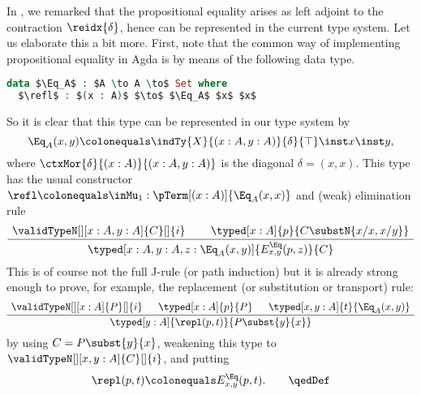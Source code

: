 \documentclass[preprint]{sigplanconf}
\begin{document}
\begin{example}
  In , we remarked that the propositional equality
  arises as left adjoint to the contraction $\reidx{\delta}$, hence can
  be represented in the current type system.
  Let us elaborate this a bit more.
  First, note that the common way of implementing propositional equality in
  Agda is by means of the following data type.
  \begin{lstlisting}[language=Agda,mathescape=true,columns=flexible]
data $\Eq_A$ : $A \to A \to$ Set where
  $\refl$ : $(x : A)$ $\to$ $\Eq_A$ $x$ $x$
  \end{lstlisting}
  So it is clear that this type can be represented in our type system by
  \begin{equation*}
    \Eq_A(x,y)  \colonequals
    \indTy{X}{(x : A, y : A)}{\delta}{\top} \inst x \inst y,
  \end{equation*}
  where $\ctxMor{\delta}{(x : A)}{(x : A, y : A)}$ is the diagonal
  $\delta = (x, x)$.
  This type has the usual constructor
  $\refl \colonequals \inMu_1 : \pTerm[(x : A)]{\Eq_A(x,x)}$ and
  (weak) elimination rule
  \begin{gather*}
    \AxiomC{$\validTypeN[][x : A, y : A]{C}[]{i}$}
    \AxiomC{$\typed[x : A]{p}{C \substN{x/x, x/y}}$}
    \BinaryInfC{$\typed[x : A, y : A, z : \Eq_A(x,y)]{
        E^{\Eq}_{x,y}(p,z)}{C}$}
    \DisplayProof
  \end{gather*}
  This is of course not the full J-rule (or path induction) but it is already
  strong enough to prove, for example, the replacement (or substitution or
  transport) rule:
  \begin{gather*}
    \insertBetweenHyps{\hskip .1in}
    \AxiomC{$\validTypeN[][x : A]{P}[]{i}$}
    \AxiomC{$\typed[x : A]{p}{P}$}
    \AxiomC{$\typed[x, y : A]{t}{\Eq_A(x,y)}$}
    \TrinaryInfC{$\typed[y : A]{
        \repl(p,t)}{P \subst{y}{x}}$}
    \DisplayProof
  \end{gather*}
  by using $C = P\subst{y}{x}$, weakening this type to
  $\validTypeN[][x,y : A]{C}[]{i}$, and putting
  \begin{equation*}
    \repl(p,t) \colonequals E^{\Eq}_{x,y}(p,t).
    \tag*{\qedDef}
  \end{equation*}
\end{example}
\end{document}

